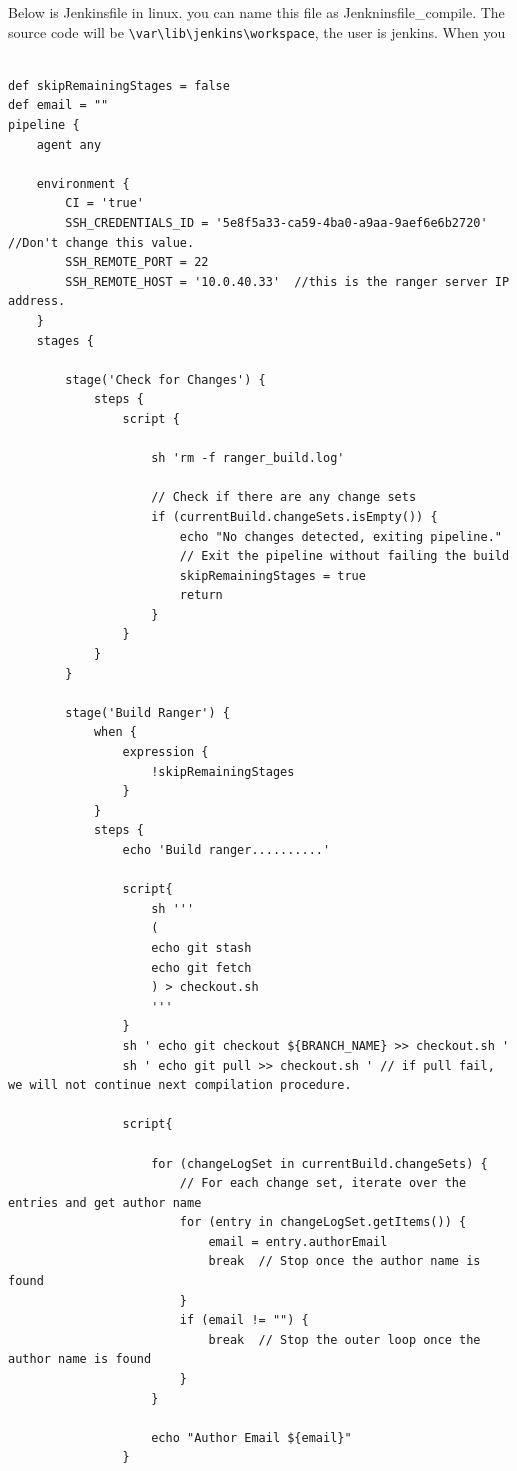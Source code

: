 \documentclass[paper=8.5in:11in, twoside, 12pt, pagesize=pdftex]{book}
\begin{document}
Below is Jenkinsfile in linux. you can name this file as Jenkninsfile\_compile. The source code will be \verb|\var\lib\jenkins\workspace|, the user is jenkins. When you 
\begin{lstlisting}

def skipRemainingStages = false
def email = "" 
pipeline {
	agent any
	
	environment {
		CI = 'true'
		SSH_CREDENTIALS_ID = '5e8f5a33-ca59-4ba0-a9aa-9aef6e6b2720' //Don't change this value.
		SSH_REMOTE_PORT = 22
		SSH_REMOTE_HOST = '10.0.40.33'  //this is the ranger server IP address.
	}
	stages {
		
		stage('Check for Changes') {
			steps {
				script {
					
					sh 'rm -f ranger_build.log'
					
					// Check if there are any change sets
					if (currentBuild.changeSets.isEmpty()) {
						echo "No changes detected, exiting pipeline."
						// Exit the pipeline without failing the build  
						skipRemainingStages = true
						return
					}
				}
			}
		}
		
		stage('Build Ranger') {   
			when {
				expression {
					!skipRemainingStages
				}
			}
			steps {
				echo 'Build ranger..........' 
				
				script{ 
					sh '''
					(
					echo git stash
					echo git fetch   
					) > checkout.sh   
					'''
				}
				sh ' echo git checkout ${BRANCH_NAME} >> checkout.sh '
				sh ' echo git pull >> checkout.sh ' // if pull fail, we will not continue next compilation procedure.   
				
				script{
					
					for (changeLogSet in currentBuild.changeSets) {
						// For each change set, iterate over the entries and get author name
						for (entry in changeLogSet.getItems()) {
							email = entry.authorEmail
							break  // Stop once the author name is found 
						}
						if (email != "") {
							break  // Stop the outer loop once the author name is found
						}        
					}
					
					echo "Author Email ${email}"
				}
				

\end{lstlisting}
\end{document}
